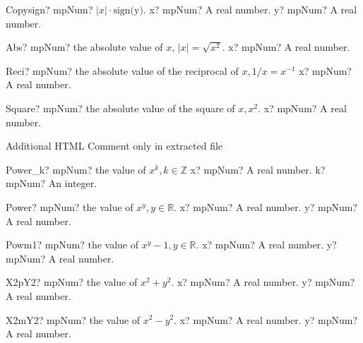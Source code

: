 \documentclass[12pt,a4paper,openany]{book}
\begin{document}
\begin{mpFunctionsExtract}
\mpFunctionTwo
{Copysign? mpNum? $|x|\cdot \text{sign(y)}$.}
{x? mpNum? A real number.}
{y? mpNum? A real number.}
\end{mpFunctionsExtract}

\begin{mpFunctionsExtract}
\mpFunctionOne
{Abs? mpNum? the absolute value of $x$, $|x| = \sqrt{x^2}$.}
{x? mpNum? A real number.}
\end{mpFunctionsExtract}

\begin{mpFunctionsExtract}
\mpFunctionOne
{Reci? mpNum? the absolute value of the reciprocal of $x,  1/x = x^{-1}$}
{x? mpNum? A real number.}
\end{mpFunctionsExtract}

\begin{mpFunctionsExtract}
\mpFunctionOne
{Square? mpNum? the absolute value of the square of $x,  x^2$.}
{x? mpNum? A real number.}
\end{mpFunctionsExtract}
Additional HTML Comment only in extracted file

\begin{mpFunctionsExtract}
\mpFunctionTwo
{Power\_k? mpNum? the value of $x^k, k \in  \mathbb{Z}$}
{x? mpNum? A real number.}
{k? mpNum? An integer.}
\end{mpFunctionsExtract}

\begin{mpFunctionsExtract}
\mpFunctionTwo
{Power? mpNum? the value of $x^y, y \in  \mathbb{R}$.}
{x? mpNum? A real number.}
{y? mpNum? A real number.}
\end{mpFunctionsExtract}

\begin{mpFunctionsExtract}
\mpFunctionTwo
{Powm1? mpNum? the value of $x^y-1, y \in  \mathbb{R}$.}
{x? mpNum? A real number.}
{y? mpNum? A real number.}
\end{mpFunctionsExtract}

\begin{mpFunctionsExtract}
\mpFunctionTwo
{X2pY2? mpNum? the value of $x^2+y^2$.}
{x? mpNum? A real number.}
{y? mpNum? A real number.}
\end{mpFunctionsExtract}

\begin{mpFunctionsExtract}
\mpFunctionTwo
{X2mY2? mpNum? the value of $x^2-y^2$.}
{x? mpNum? A real number.}
{y? mpNum? A real number.}
\end{mpFunctionsExtract}
\end{document}
